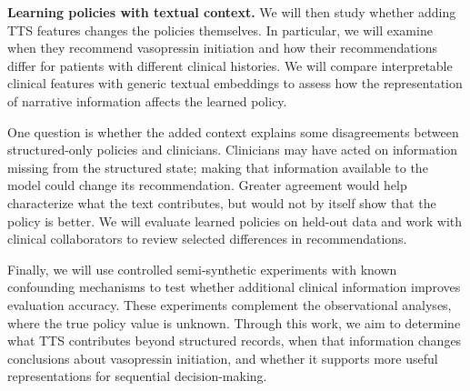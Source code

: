 \textbf{Learning policies with textual context.}
We will then study whether adding TTS features changes the policies themselves.
In particular, we will examine when they recommend vasopressin initiation and how their recommendations differ for patients with different clinical histories.
We will compare interpretable clinical features with generic textual embeddings to assess how the representation of narrative information affects the learned policy.

One question is whether the added context explains some disagreements between structured-only policies and clinicians.
Clinicians may have acted on information missing from the structured state; making that information available to the model could change its recommendation.
Greater agreement would help characterize what the text contributes, but would not by itself show that the policy is better.
We will evaluate learned policies on held-out data and work with clinical collaborators to review selected differences in recommendations.

Finally, we will use controlled semi-synthetic experiments with known confounding mechanisms to test whether additional clinical information improves evaluation accuracy.
These experiments complement the observational analyses, where the true policy value is unknown.
Through this work, we aim to determine what TTS contributes beyond structured records, when that information changes conclusions about vasopressin initiation, and whether it supports more useful representations for sequential decision-making.